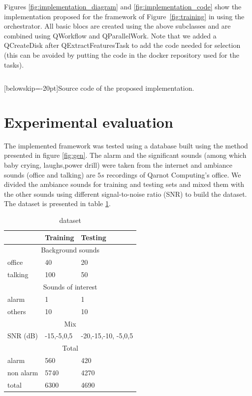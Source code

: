 \documentclass[10pt, conference, compsocconf]{IEEEtran}
\begin{document}
Figures \ref{fig:implementation_diagram} and \ref{fig:implementation_code} show the implementation proposed for the framework of Figure~\ref{fig:training} in using the orchestrator. All basic blocs are created using the above subclasses and are combined using QWorkflow and QParallelWork. Note that we added a QCreateDisk after QExtractFeaturesTask to add the code needed for selection (this can be avoided by putting the code in the docker repository used for the tasks).

\begin{mdframed}[backgroundcolor=LightGray,topline=false, bottomline=false,leftline=false, rightline=false]
\inputminted[baselinestretch=1, fontsize=\scriptsize]{python}{selection.py}
\end{mdframed}
[belowskip=-20pt]{Source code of the proposed implementation.}
\label{fig:implementation_code}
\section{Experimental evaluation} \label{Proof-of-concept}
The implemented framework was tested using a database built using the method presented in figure \ref{fig:gen}. The alarm and the significant sounds (among which baby crying, laughs,power drill) were taken from the internet and ambiance sounds (office and talking) are $5s$ recordings of Qarnot Computing's office. We divided the ambiance sounds for training and testing sets and mixed them with the other sounds using different signal-to-noise ratio (SNR) to build the dataset. The dataset is presented in table \ref{table:dataset}.
\begin{table}[h]
  \centering
  \begin{tabular}{|*{3}{l|}}
    \hline
    & Training & Testing \\
    \hline
    \multicolumn{3}{|c|}{Background sounds} \\
    \hline
    office & 40 & 20\\
    talking & 100 & 50 \\
    \hline
    \multicolumn{3}{|c|}{Sounds of interest} \\
    \hline
    alarm & 1 & 1 \\
    others & 10 & 10 \\
    \hline
    \multicolumn{3}{|c|}{Mix} \\
    \hline
    SNR (dB)& -15,-5,0,5 & -20,-15,-10, -5,0,5 \\
    \hline
    \multicolumn{3}{|c|}{Total} \\ 
    \hline
    alarm & 560 & 420 \\
    non alarm & 5740 & 4270 \\
    total & 6300 & 4690 \\
   \hline
  \end{tabular}
\caption{dataset \label{table:dataset}}
\end{table}
\end{document}
